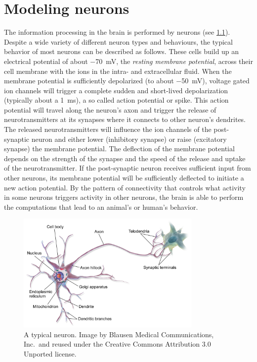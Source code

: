 \chapter{Modeling neurons}\label{sec:neurons}
The information processing in the brain is performed by neurons (see \cref{fig:neuron}).
Despite a wide variety of different neuron types and behaviours, the typical behavior of most neurons can be described as follows.
These cells build up an electrical potential of about \SI{-70}{\milli\volt}, the \emph{resting membrane potential}, across their cell membrane with the ions in the intra- and extracellular fluid.
When the membrane potential is sufficiently depolarized (to about \SI{-50}{\milli\volt}), voltage gated ion channels will trigger a complete sudden and short-lived depolarization (typically about a \SI{1}{\milli\second}), a so called action potential or spike.
This action potential will travel along the neuron's axon and trigger the release of neurotransmitters at its synapses where it connects to other neuron's dendrites.
The released neurotransmitters will influence the ion channels of the post-synaptic neuron and either lower (inhibitory synapse) or raise (excitatory synapse) the membrane potential.
The deflection of the membrane potential depends on the strength of the synapse and the speed of the release and uptake of the neurotransmitter.
If the post-synaptic neuron receives sufficient input from other neurons, its membrane potential will be sufficiently deflected to initiate a new action potential.
By the pattern of connectivity that controls what activity in some neurons triggers activity in other neurons, the brain is able to perform the computations that lead to an animal's or human's behavior.

\begin{figure}
    \centering
    \includegraphics[width=0.8\textwidth]{figures/Blausen_0657_MultipolarNeuron}
    \caption[A typical neuron]{A typical neuron. Image by Blausen Medical Communications, Inc.\ and reused under the Creative Commons Attribution 3.0 Unported license.}\label{fig:neuron}
\end{figure}

